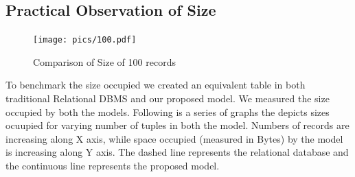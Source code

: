 \documentclass[12pt, oneside]{book}
\begin{document}
\subsection{Practical Observation of Size}
\begin{figure}[ht]
  \centering
   \texttt{[image: pics/100.pdf]}
   \caption{Comparison of Size of 100 records}
   \label{fig:100result}
\end{figure}
To benchmark the size occupied we created an equivalent table in both traditional Relational DBMS and our proposed model. We measured the size occupied by both the models. Following is a series of graphs the depicts sizes ocuupied for varying number of tuples in both the model. Numbers of records are increasing along X axis, while space occupied (measured in Bytes) by the model is increasing along Y axis. The dashed line represents the relational database and the continuous line represents the proposed model.
\end{document}
